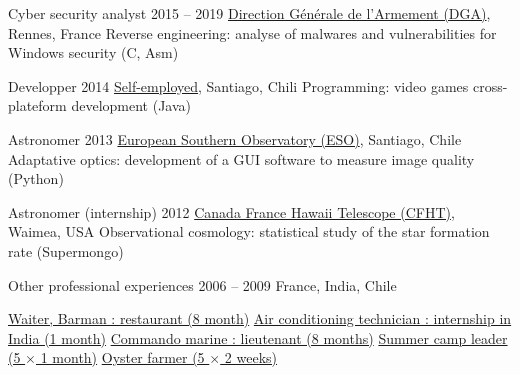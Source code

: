 \begin{joblist}[12.8][8.4][4]

\setlength{\parskip}{0.3cm}
\vspace{-0.4cm}

\item[Cyber security analyst]{2015 -- 2019}
  {
  \href{http://www.defense.gouv.fr/dga/}{Direction Générale de l'Armement (DGA)}, Rennes, France
  }
  {Reverse engineering: analyse of malwares and vulnerabilities for Windows security (C, Asm)}


\item[Developper]{2014}
  {
  \href{https://tinmarino.github.io/page/}{Self-employed}, Santiago, Chili
  }
  {Programming: video games cross-plateform development (Java)}


\item[Astronomer]{2013}
  {
  \href{http://www.eso.org/public/}{European Southern Observatory (ESO)}, Santiago, Chile
  }
  {Adaptative optics: development of a GUI software to measure image quality (Python)}


\item[Astronomer (internship)]{2012}
	{
\href{https://www.cfht.hawaii.edu/}{Canada France Hawaii Telescope (CFHT)}, Waimea, USA
  }
  {Observational cosmology: statistical study of the star formation rate (Supermongo)}


\item[Other professional experiences]{2006 -- 2009}
	{
	France, India, Chile
	}
	{
    \renewcommand\labelitemi{{}}
		\vspace{-0.8cm}
    \setlength{\parskip}{0cm}
		\begin{itemize}
		\setlength\itemsep{0cm}

    \cvitem \href{http://www.insertcoin.cl/}{ Waiter, Barman : restaurant (8 month)}
    \cvitem \href{http://www.dupont.co.in/}{ Air conditioning technician : internship in India (1 month)}
    \cvitem \href{http://www.defense.gouv.fr/marine/organisation/forces/fusiliers-marins-et-commandos/force-maritime-des-fusiliers-marins-et-commandos}{ Commando marine : lieutenant (8 months)}
    \cvitem \href{http://www.vacances-pour-tous.org/}{ Summer camp leader (5 $\times$ 1 month)}
    \cvitem \href{http://huitresdesaintvaast.fr/}{ Oyster farmer (5 $\times$ 2 weeks)}
		\end{itemize}
  }

\end{joblist}


